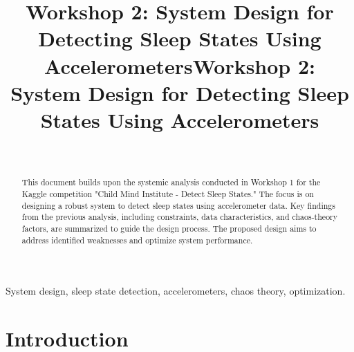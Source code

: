 \documentclass[conference]{IEEEtran}
\begin{document}
\title{Workshop 2: System Design for Detecting Sleep States Using Accelerometers}
\title{\IEEEoverridecommandlockouts Workshop 2: System Design for Detecting Sleep States Using Accelerometers}
\author{
	\\
	\and
}

\maketitle

\begin{abstract}
	This document builds upon the systemic analysis conducted in Workshop 1 for the Kaggle competition "Child Mind Institute - Detect Sleep States." The focus is on designing a robust system to detect sleep states using accelerometer data. Key findings from the previous analysis, including constraints, data characteristics, and chaos-theory factors, are summarized to guide the design process. The proposed design aims to address identified weaknesses and optimize system performance.
\end{abstract}

\begin{IEEEkeywords}
	System design, sleep state detection, accelerometers, chaos theory, optimization.
\end{IEEEkeywords}

\section{Introduction}
\end{document}

